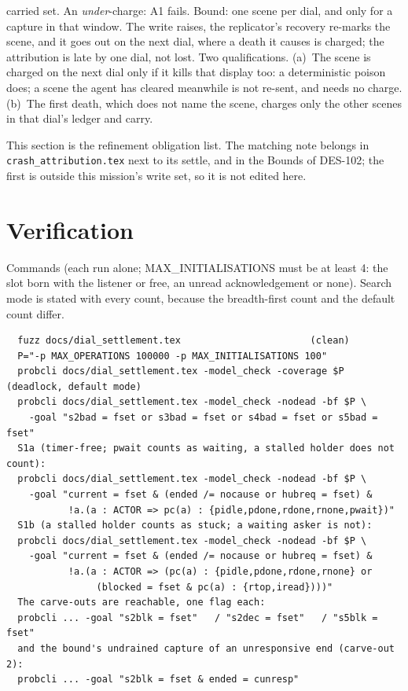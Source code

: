 \documentclass[a4paper,10pt,fleqn]{article}
\begin{document}
\begin{enumerate}
    carried set.  An \emph{under}-charge: A1 fails.  Bound: one scene per dial,
    and only for a capture in that window.  The write raises, the replicator's
    recovery re-marks the scene, and it goes out on the next dial, where a death
    it causes is charged; the attribution is late by one dial, not lost.  Two
    qualifications.  (a)~The scene is charged on the next dial only if it kills
    that display too: a deterministic poison does; a scene the agent has cleared
    meanwhile is not re-sent, and needs no charge.  (b)~The first death, which
    does not name the scene, charges only the other scenes in that dial's ledger
    and carry.
\end{enumerate}

This section is the refinement obligation list.  The matching note belongs in
\texttt{crash\_attribution.tex} next to its settle, and in the Bounds of DES-102;
the first is outside this mission's write set, so it is not edited here.

\section{Verification}

Commands (each run alone; MAX\_INITIALISATIONS must be at least 4: the slot
born with the listener or free, an unread acknowledgement or none).  Search mode
is stated with every count, because the breadth-first count and the default
count differ.

\begin{verbatim}
  fuzz docs/dial_settlement.tex                       (clean)
  P="-p MAX_OPERATIONS 100000 -p MAX_INITIALISATIONS 100"
  probcli docs/dial_settlement.tex -model_check -coverage $P          (deadlock, default mode)
  probcli docs/dial_settlement.tex -model_check -nodead -bf $P \
    -goal "s2bad = fset or s3bad = fset or s4bad = fset or s5bad = fset"
  S1a (timer-free; pwait counts as waiting, a stalled holder does not count):
  probcli docs/dial_settlement.tex -model_check -nodead -bf $P \
    -goal "current = fset & (ended /= nocause or hubreq = fset) &
           !a.(a : ACTOR => pc(a) : {pidle,pdone,rdone,rnone,pwait})"
  S1b (a stalled holder counts as stuck; a waiting asker is not):
  probcli docs/dial_settlement.tex -model_check -nodead -bf $P \
    -goal "current = fset & (ended /= nocause or hubreq = fset) &
           !a.(a : ACTOR => (pc(a) : {pidle,pdone,rdone,rnone} or
                (blocked = fset & pc(a) : {rtop,iread})))"
  The carve-outs are reachable, one flag each:
  probcli ... -goal "s2blk = fset"   / "s2dec = fset"   / "s5blk = fset"
  and the bound's undrained capture of an unresponsive end (carve-out 2):
  probcli ... -goal "s2blk = fset & ended = cunresp"
\end{verbatim}
\end{document}

